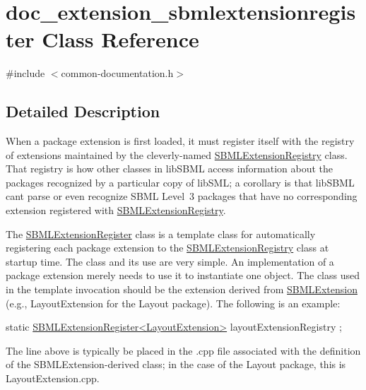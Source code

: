 \hypertarget{classdoc__extension__sbmlextensionregister}{}\section{doc\+\_\+extension\+\_\+sbmlextensionregister Class Reference}
\label{classdoc__extension__sbmlextensionregister}


{\ttfamily \#include $<$common-\/documentation.\+h$>$}



\subsection{Detailed Description}
\begin{DoxyParagraph}{}
When a package extension is first loaded, it must register itself with the registry of extensions maintained by the cleverly-\/named \hyperlink{class_s_b_m_l_extension_registry}{S\+B\+M\+L\+Extension\+Registry} class. That registry is how other classes in lib\+S\+B\+ML access information about the packages recognized by a particular copy of lib\+S\+ML; a corollary is that lib\+S\+B\+ML can\textquotesingle{}t parse or even recognize S\+B\+ML Level~3 packages that have no corresponding extension registered with \hyperlink{class_s_b_m_l_extension_registry}{S\+B\+M\+L\+Extension\+Registry}.
\end{DoxyParagraph}
The \hyperlink{class_s_b_m_l_extension_register}{S\+B\+M\+L\+Extension\+Register} class is a template class for automatically registering each package extension to the \hyperlink{class_s_b_m_l_extension_registry}{S\+B\+M\+L\+Extension\+Registry} class at startup time. The class and its use are very simple. An implementation of a package extension merely needs to use it to instantiate one object. The class used in the template invocation should be the extension derived from \hyperlink{class_s_b_m_l_extension}{S\+B\+M\+L\+Extension} (e.\+g., Layout\+Extension for the Layout package). The following is an example\+:


\begin{DoxyCode}
\textcolor{keyword}{static} \hyperlink{class_s_b_m_l_extension_register}{SBMLExtensionRegister<LayoutExtension>} layoutExtensionRegistry
      ;
\end{DoxyCode}


The line above is typically be placed in the {\ttfamily .cpp} file associated with the definition of the S\+B\+M\+L\+Extension-\/derived class; in the case of the Layout package, this is {\ttfamily Layout\+Extension.\+cpp}.

